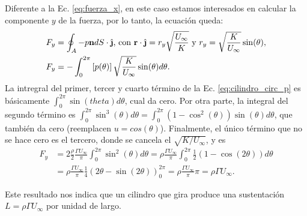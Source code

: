 Diferente a la Ec. \eqref{eq:fuerza_x}, en este caso estamos interesados en calcular la componente $y$ de la fuerza, por lo tanto, la ecuación queda: 
%
\begin{align}\label{eq:fuerza_y}
&F_y = \oint_A -p\mathbf{n}dS\cdot\jhat \text{, con }\mathbf{r}\cdot\jhat =r_y\sqrt{\frac{U_\infty}{K}} \text{ y } r_y = \sqrt{\frac{K}{U_\infty}}\sin(\theta),\nonumber\\
&F_y = -\int_0^{2\pi}\left[p(\theta)\right]\sqrt{\frac{K}{U_\infty}}\sin(\theta)d\theta.
\end{align}
%
La intregral del primer, tercer y cuarto término de la Ec. \eqref{eq:cilindro_circ_p} es básicamente $\int_0^{2\pi}\sin(theta)d\theta$, cual da cero.
Por otra parte, la integral del segundo término es $\int_0^{2\pi}\sin^3(\theta)d\theta=\int_0^{2\pi}(1-\cos^2(\theta))\sin(\theta)d\theta$, que también da cero (reemplacen $u=cos(\theta)$).
Finalmente, el único término que no se hace cero es el tercero, donde se cancela el $\sqrt{K/U_\infty}$, y es
%
\begin{align}
F_y &= 2\frac{\rho}{2}\frac{\Gamma U_\infty}{\pi}\int_0^{2\pi}\sin^2(\theta)d\theta = \rho\frac{\Gamma U_\infty}{\pi}\int_0^{2\pi}\frac{1}{2}(1-\cos(2\theta))d\theta\nonumber\\
    &= \rho\frac{\Gamma U_\infty}{\pi}\frac{1}{4}(2\theta-\sin(2\theta))_0^{2\pi} = \rho\frac{\Gamma U_\infty}{\pi}\pi = \rho\Gamma U_\infty.
\end{align}

Este resultado nos indica que un cilindro que gira produce una sustentación $L=\rho\Gamma U_\infty$ por unidad de largo.
